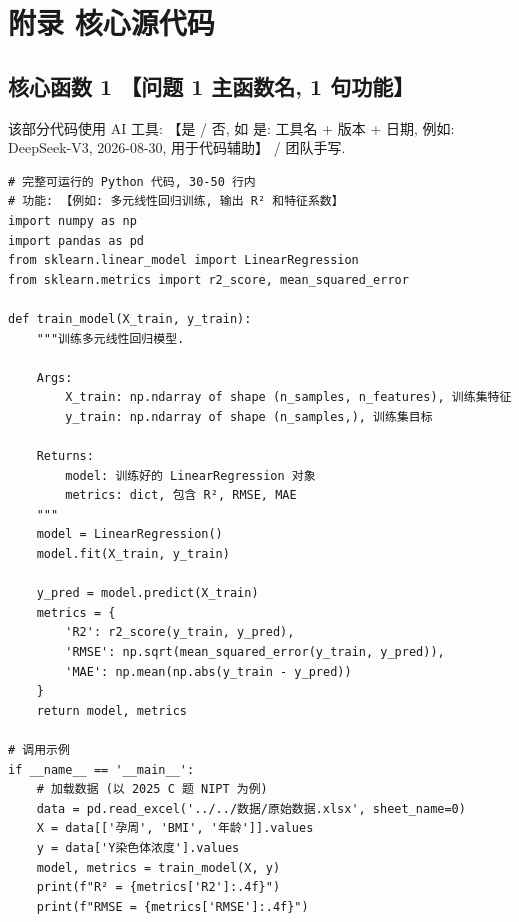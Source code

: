 
\section*{附录 \quad 核心源代码}

\subsection*{核心函数 1 \quad 【问题 1 主函数名, 1 句功能】}

该部分代码使用 AI 工具: 【是 / 否, 如 是: 工具名 + 版本 + 日期, 例如: DeepSeek-V3, 2026-08-30, 用于代码辅助】 / 团队手写.

\begin{verbatim}
# 完整可运行的 Python 代码, 30-50 行内
# 功能: 【例如: 多元线性回归训练, 输出 R² 和特征系数】
import numpy as np
import pandas as pd
from sklearn.linear_model import LinearRegression
from sklearn.metrics import r2_score, mean_squared_error

def train_model(X_train, y_train):
    """训练多元线性回归模型.

    Args:
        X_train: np.ndarray of shape (n_samples, n_features), 训练集特征
        y_train: np.ndarray of shape (n_samples,), 训练集目标

    Returns:
        model: 训练好的 LinearRegression 对象
        metrics: dict, 包含 R², RMSE, MAE
    """
    model = LinearRegression()
    model.fit(X_train, y_train)

    y_pred = model.predict(X_train)
    metrics = {
        'R2': r2_score(y_train, y_pred),
        'RMSE': np.sqrt(mean_squared_error(y_train, y_pred)),
        'MAE': np.mean(np.abs(y_train - y_pred))
    }
    return model, metrics

# 调用示例
if __name__ == '__main__':
    # 加载数据 (以 2025 C 题 NIPT 为例)
    data = pd.read_excel('../../数据/原始数据.xlsx', sheet_name=0)
    X = data[['孕周', 'BMI', '年龄']].values
    y = data['Y染色体浓度'].values
    model, metrics = train_model(X, y)
    print(f"R² = {metrics['R2']:.4f}")
    print(f"RMSE = {metrics['RMSE']:.4f}")
\end{verbatim}

